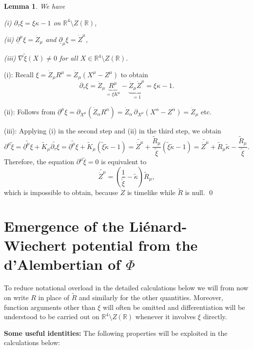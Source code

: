 \documentclass[sumlimits,intlimits,namelimits%
]{amsart}
\newcommand{\mb}[1]{\ensuremath{\mathbb{#1}}}
\newcommand{\R}{\mb{R}}
\renewcommand{\d}{\ensuremath{\partial}}
\newtheorem{lemma}[theorem]{Lemma}
\theoremstyle{definition}
\newcommand{\al}{\alpha}
\newcommand{\ud}{\underline{\d}}
\begin{document}
\begin{lemma}\label{XiLem} We have

(i) $\d_\tau\xi  = \xi\kappa-1$ on $\R^4 \setminus Z(\R)$, 

(ii) $\ud^{\mu}\xi=\dot{Z}_\mu$ and $\ud_\mu \xi=\dot{Z}^\mu$, 

(iii) $\nabla \widetilde{\xi}(X) \neq 0$ for all $X \in \R^4 \setminus Z(\R)$.

\end{lemma} 
\proof (i): Recall  $\xi =\dot{Z}_\mu R^\mu =\dot{Z}_\mu (X^\mu-Z^\mu)$ to obtain
$$
  \d_\tau\xi =\ddot{Z}_\mu \underbrace{R^\mu}_{=\xi K^\mu}-\underbrace{\dot{Z}_\mu\dot{Z}^\mu}_{=1}=\xi\kappa-1.
$$

(ii): Follows from $\ud^\mu \xi = \d_{X^\mu}  (\dot{Z}_\al R^\al) = \dot{Z}_\al \, \d_{X^\mu}  (X^\al - Z^\al) = \dot{Z}_\mu$ etc.

(iii): Applying (i) in the second step and (ii) in the third step, we obtain
$$
  \d^\mu \widetilde{\xi} = \widetilde{\ud^\mu \xi} + \widetilde{K}_\mu  \widetilde{\d_\tau \xi} 
  = \widetilde{\ud^\mu \xi} + \widetilde{K}_\mu (\widetilde{\xi} \widetilde{\kappa} - 1)
  =  \widetilde{\dot{Z}^\mu} + \frac{\widetilde{R}_\mu}{\widetilde{\xi}} (\widetilde{\xi} \widetilde{\kappa} - 1)
  =  \widetilde{\dot{Z}^\mu} + \widetilde{R}_\mu \widetilde{\kappa} - \frac{\widetilde{R}_\mu}{\widetilde{\xi}}.
$$
Therefore, the equation $ \d^\mu \widetilde{\xi} =0 $ is equivalent to 
$$
     \widetilde{\dot{Z}^\mu} = \left( \frac{1}{\widetilde{\xi}} -  \widetilde{\kappa} \right) \widetilde{R}_\mu,
$$
which is impossible to obtain, because $\dot{Z}$ is timelike while $\widetilde{R}$ is null. 
\qed

\section{Emergence of the Li\'{e}nard-Wiechert potential from the d'Alembertian of $\Phi$}\label{SecLWP}

To reduce notational overload in the detailed calculations below we will from now on write $R$ in place of $\widetilde{R}$ and similarly for the other quantities. Moreover,  function arguments other than $\xi$ will often be omitted and differentiation will be understood to be carried out on $\R^4 \setminus Z(\R)$ whenever it involves $\xi$ directly.

\textbf{Some useful identities:} 
The following properties will be exploited in the calculations below:
\end{document}
